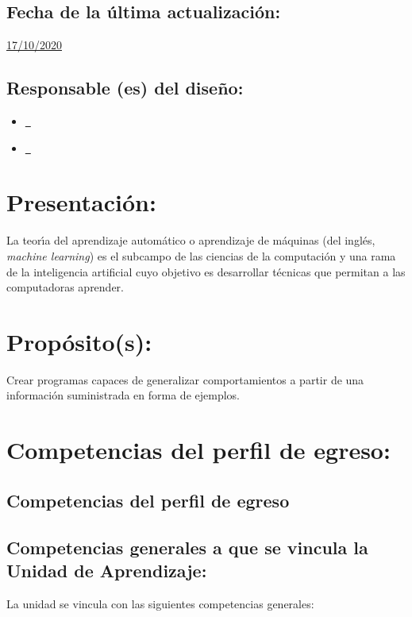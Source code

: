 \documentclass[10 pt]{article}
\begin{document}
\subsection{Fecha de la \'{u}ltima actualizaci\'{o}n:} \underline{17/10/2020}
\subsection{Responsable (es) del dise\~{n}o:}
\begin{itemize}[label={}]
\item \underline{\narturo~\arturo}
\item \underline{\nelisa~\elisa}
\end{itemize}
\newpage
\section{Presentaci\'{o}n:}

La teor\'{\i}a del aprendizaje autom\'{a}tico o aprendizaje de m\'{a}quinas (del
ingl\'{e}s, {\em machine learning}) es el subcampo de las ciencias de la
computaci\'{o}n y una rama de la inteligencia artificial cuyo objetivo es
desarrollar t\'{e}cnicas que permitan a las computadoras aprender.

\section{Prop\'{o}sito(s):}

Crear programas capaces de generalizar comportamientos a partir de una
informaci\'{o}n suministrada en forma de ejemplos.

\section{Competencias del perfil de egreso:}
\subsection{Competencias del perfil de egreso}




  
\subsection{Competencias generales a que se vincula la Unidad de
    Aprendizaje:}

  La unidad se vincula con las siguientes competencias generales:
\end{document}
